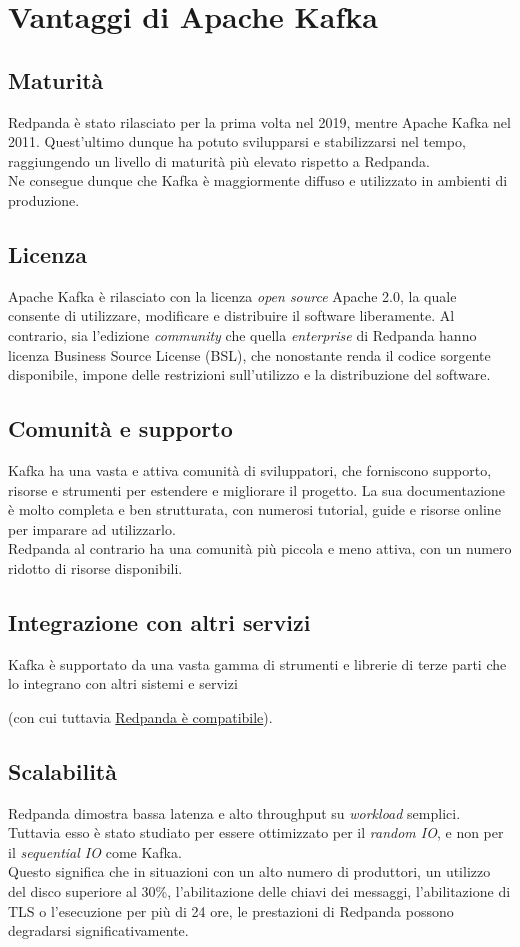 \section{Vantaggi di Apache Kafka}
\subsection{Maturità}
Redpanda è stato rilasciato per la prima volta nel 2019, mentre Apache Kafka nel 2011.
Quest'ultimo dunque ha potuto svilupparsi e stabilizzarsi nel tempo, raggiungendo
un livello di maturità più elevato rispetto a Redpanda.\\
Ne consegue dunque che Kafka è maggiormente diffuso e utilizzato in ambienti di
produzione.

\subsection{Licenza}
Apache Kafka è rilasciato con la licenza \textit{open source} Apache 2.0, la quale consente di utilizzare, modificare e distribuire il software liberamente.
Al contrario, sia l'edizione \textit{community} che quella \textit{enterprise} di Redpanda hanno licenza Business Source License (BSL), che
nonostante renda il codice sorgente disponibile, impone delle restrizioni sull'utilizzo e la distribuzione del software.


\subsection{Comunità e supporto}
Kafka ha una vasta e attiva comunità di sviluppatori, che forniscono supporto, risorse e strumenti per estendere e migliorare il progetto.
La sua documentazione è molto completa e ben strutturata, con numerosi tutorial, guide e risorse online per imparare ad utilizzarlo.\\
Redpanda al contrario ha una comunità più piccola e meno attiva, con un numero ridotto di risorse disponibili.

\subsection{Integrazione con altri servizi}
Kafka è supportato da una vasta gamma di strumenti e librerie di terze parti che lo integrano con altri sistemi e servizi

(con cui tuttavia \href{https://docs.redpanda.com/current/develop/kafka-clients/}{Redpanda è compatibile}).

\subsection{Scalabilità}
Redpanda dimostra bassa latenza e alto throughput su \textit{workload} semplici. Tuttavia esso è stato studiato per essere ottimizzato per il \textit{random IO}, e non per il \textit{sequential IO} come Kafka.\\
Questo significa che in situazioni con un alto numero di produttori, un utilizzo del disco superiore al 30\%, l'abilitazione delle chiavi dei messaggi, l'abilitazione di TLS o l'esecuzione per più di 24 ore,
le prestazioni di Redpanda possono degradarsi significativamente.\\

